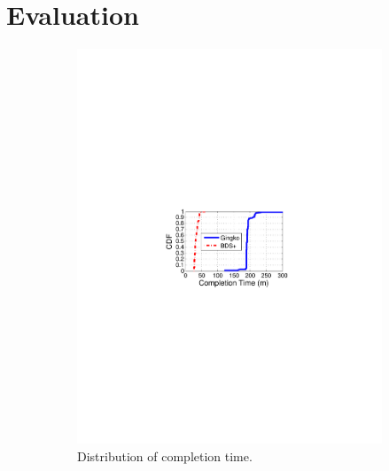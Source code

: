 \section{Evaluation}
\label{sec:evaluation}
\begin{figure}[t]
        \centering
        \begin{subfigure}[b]{0.3\textwidth}
                \centering
                \includegraphics[width=\textwidth]{images/BDSvsAnon_overall_journal.pdf}%
                \caption{Distribution of completion time.}
                \label{fig:BDSvsAnon:overall}
        \end{subfigure}
        \begin{subfigure}[b]{0.3\textwidth}
                \centering

\end{subfigure}
\end{figure}
